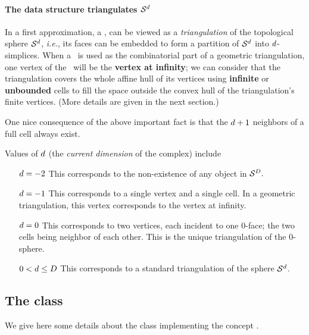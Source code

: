 {{\newcommand{\sphere}{\ensuremath{\mathcal S}}

\paragraph{The data structure triangulates $\sphere^\cd$}

In a first approximation,
a \tds, can be viewed as
a \emph{triangulation} of the topological sphere $\sphere^\cd$,
\emph{i.e.}, its faces can be embedded to form a partition of $\sphere^\cd$ into $d$-simplices. When a
\tds\ is used as the combinatorial part of a geometric triangulation, one
vertex of the \tds\ will be the \textbf{vertex at
infinity}; we can consider that the triangulation covers the whole
affine hull of its vertices
using \textbf{infinite} or \textbf{unbounded} cells to fill the space  outside the convex
hull of the triangulation's finite vertices. (More details are given in the next section.)

One nice consequence of the above important fact is that the $d+1$ neighbors
of a full cell always exist.

Values of $d$ (the \emph{current dimension} of the complex) include
\begin{itemize}
\item[$d=-2$] This corresponds to the non-existence of any object in
$\sphere^\ad.$
\item[$d=-1$] This corresponds to a single vertex and a single cell. In a
geometric triangulation, this vertex corresponds to the vertex at infinity.
\item[$d=0$] This corresponds to two vertices, each incident to one $0$-face;
the two cells being neighbor of each other. This is the unique
triangulation of the $0$-sphere.
\item[$0<d\le D$] This corresponds to a standard triangulation of
the sphere $\sphere^\cd$.
\end{itemize}


\subsection{The class \label{triangulation:tds:impl}}

We give here some details about the class
implementing the concept .


}}
